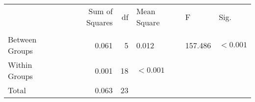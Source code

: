 \begin{tabular}{lrrlll}
\toprule
 & Sum of Squares & df & Mean Square & F & Sig. \\
 &  &  &  &  &  \\
\midrule
Between Groups & 0.061 & 5 & 0.012 & 157.486 & $< 0.001$ \\
Within Groups & 0.001 & 18 & $< 0.001$ &  &  \\
Total & 0.063 & 23 &  &  &  \\
\bottomrule
\end{tabular}
